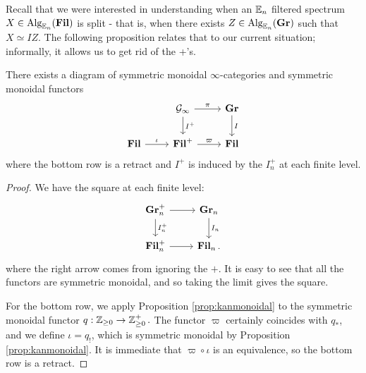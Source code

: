 Recall that we were interested in understanding when an $\operatorname{\mathbb{E}}_n$ filtered spectrum $X\in \operatorname{\text{Alg}}_{\operatorname{\mathbb{E}}_n}(\operatorname{\textbf{Fil}})$ is split - that is, when there exists $Z\in \operatorname{\text{Alg}}_{\operatorname{\mathbb{E}}_n}(\operatorname{\textbf{Gr}})$ such that $X \simeq IZ.$  The following proposition relates that to our current situation; informally, it allows us to get rid of the +'s.

\begin{prop}\label{prop:MonRet}
There exists a diagram of symmetric monoidal $\infty$-categories and symmetric monoidal functors 
$$
\begin{tikzcd}
&\mathcal{G}_\infty \arrow[r,"\pi"] \arrow[d, "I^+"]&  \Gr \arrow[d, "I"]\\
\Fil \arrow[r,"\iota"] & \Fil^+ \arrow[r,"\varpi"]& \Fil
\end{tikzcd}
$$
where the bottom row is a retract and $I^+$ is induced by the $I_n^+$ at each finite level.  
\end{prop} 
\begin{proof}

We have the square at each finite level: %
$$
\begin{tikzcd}
\Gr_{n}^+ \arrow[r] \arrow[d,"I_n^{+}"] & \Gr_{n} \arrow[d,"I_n"]\\
\Fil_n^+  \arrow[r] & \Fil_n .
\end{tikzcd}
$$
where the right arrow comes from ignoring the $+$.  It is easy to see that all the functors are symmetric monoidal, and so taking the limit gives the square.  

For the bottom row, we apply Proposition \ref{prop:kanmonoidal} to the symmetric monoidal functor $q:\operatorname{\mathbb{Z}}_{\geq 0} \to \operatorname{\mathbb{Z}}_{\geq 0}^+.$  The functor $\varpi$ certainly coincides with $q_*$, and we define $\iota = q_!$, which is symmetric monoidal by Proposition \ref{prop:kanmonoidal}.  It is immediate that $\varpi \circ \iota$ is an equivalence, so the bottom row is a retract.  

\end{proof}


